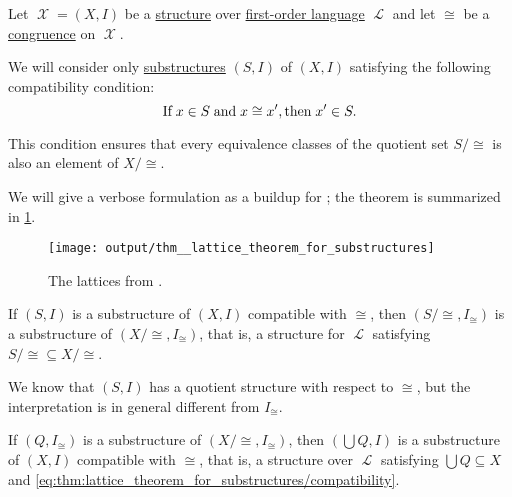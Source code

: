 \begin{theorem}\label{thm:lattice_theorem_for_substructures}
  Let \( \mscrX = (X, I) \) be a \hyperref[def:first_order_structure]{structure} over \hyperref[def:first_order_language]{first-order language} \( \mscrL \) and let \( {\cong} \) be a \hyperref[def:first_order_congruence]{congruence} on \( \mscrX \).

  We will consider only \hyperref[def:first_order_substructure]{substructures} \( (S, I) \) of \( (X, I) \) satisfying the following compatibility condition:
  \begin{equation}\label{eq:thm:lattice_theorem_for_substructures/compatibility}
    \T{If} x \in S \T{and} x \cong x', \T{then} x' \in S.
  \end{equation}

  This condition ensures that every equivalence classes of the quotient set \( S / {\cong} \) is also an element of \( X / {\cong} \).

  We will give a verbose formulation as a buildup for ; the theorem is summarized in \ref{fig:thm:lattice_theorem_for_substructures}.

  \begin{figure}[!ht]
    \centering
    \texttt{[image: output/thm\_\_lattice\_theorem\_for\_substructures]}
    \caption{The lattices from .}
    \label{fig:thm:lattice_theorem_for_substructures}
  \end{figure}

  \begin{thmenum}
     If \( (S, I) \) is a substructure of \( (X, I) \) compatible with \( {\cong} \), then \( (S / {\cong}, I_\cong) \) is a substructure of \( (X / {\cong}, I_\cong) \), that is, a structure for \( \mscrL \) satisfying \( S / {\cong} \subseteq X / {\cong} \).

    We know that \( (S, I) \) has a quotient structure with respect to \( {\cong} \), but the interpretation is in general different from \( I_\cong \).

     If \( (Q, I_\cong) \) is a substructure of \( (X / {\cong}, I_\cong) \), then \( (\bigcup Q, I) \) is a substructure of \( (X, I) \) compatible with \( {\cong} \), that is, a structure over \( \mscrL \) satisfying \( \bigcup Q \subseteq X \) and \eqref{eq:thm:lattice_theorem_for_substructures/compatibility}.


\end{thmenum}
\end{theorem}
